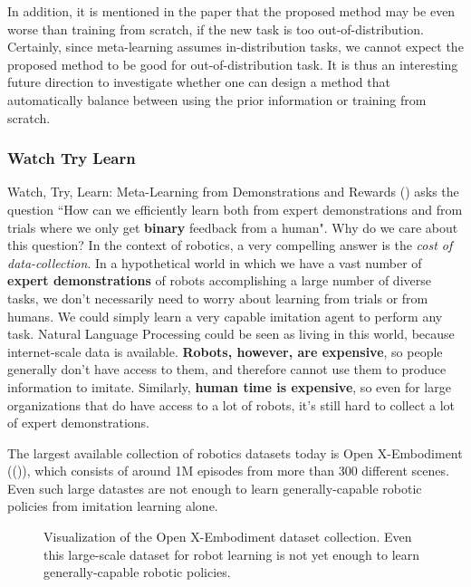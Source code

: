 \documentclass[
  letterpaper,
  numbers=noenddot,
  DIV=11,
  oneside]{scrreprt}
\theoremstyle{remark}
\begin{document}
In addition, it is mentioned in the paper that the proposed method may
be even worse than training from scratch, if the new task is too
out-of-distribution. Certainly, since meta-learning assumes
in-distribution tasks, we cannot expect the proposed method to be good
for out-of-distribution task. It is thus an interesting future direction
to investigate whether one can design a method that automatically
balance between using the prior information or training from scratch.

\subsubsection{Watch Try Learn}\label{sec-watch}

Watch, Try, Learn: Meta-Learning from Demonstrations and Rewards
() asks the question ``How
can we efficiently learn both from expert demonstrations and from trials
where we only get \textbf{binary} feedback from a human". Why do we care
about this question? In the context of robotics, a very compelling
answer is the \emph{cost of data-collection}. In a hypothetical world in
which we have a vast number of \textbf{expert demonstrations} of robots
accomplishing a large number of diverse tasks, we don't necessarily need
to worry about learning from trials or from humans. We could simply
learn a very capable imitation agent to perform any task. Natural
Language Processing could be seen as living in this world, because
internet-scale data is available. \textbf{Robots, however, are
expensive}, so people generally don't have access to them, and therefore
cannot use them to produce information to imitate. Similarly,
\textbf{human time is expensive}, so even for large organizations that
do have access to a lot of robots, it's still hard to collect a lot of
expert demonstrations.

The largest available collection of robotics datasets today is Open
X-Embodiment (()),
which consists of around 1M episodes from more than 300 different
scenes. Even such large datastes are not enough to learn
generally-capable robotic policies from imitation learning alone.

\begin{figure}


\caption{\label{fig-open-x-embodiment}Visualization of the Open
X-Embodiment dataset collection. Even this large-scale dataset for robot
learning is not yet enough to learn generally-capable robotic policies.}

\end{figure}%
\end{document}
